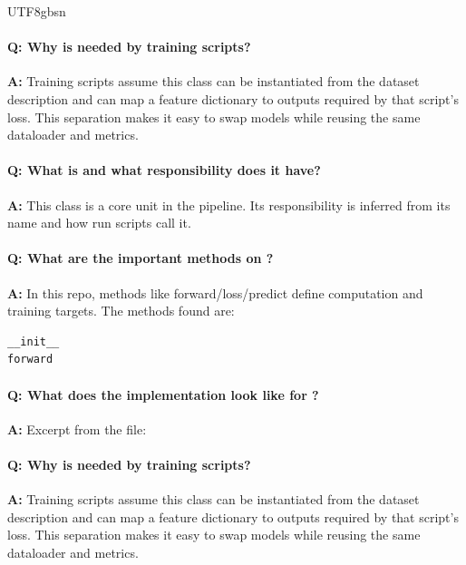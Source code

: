 \documentclass[11pt]{article}
\begin{document}
\begin{CJK*}{UTF8}{gbsn}
\vspace{1mm}


\paragraph{Q: Why is \texttt{} needed by training scripts?}
\textbf{A:} Training scripts assume this class can be instantiated from the dataset description and can map a feature dictionary to outputs required by that script's loss. This separation makes it easy to swap models while reusing the same dataloader and metrics.

\paragraph{Q: What is \texttt{} and what responsibility does it have?}
\textbf{A:} This class is a core unit in the pipeline. Its responsibility is inferred from its name and how run scripts call it.

\paragraph{Q: What are the important methods on \texttt{}?}
\textbf{A:} In this repo, methods like forward/loss/predict define computation and training targets. The methods found are:

\begin{Verbatim}[fontsize=\small]
__init__
forward
\end{Verbatim}

\paragraph{Q: What does the implementation look like for \texttt{}?}
\textbf{A:} Excerpt from the file:

\vspace{1mm}


\paragraph{Q: Why is \texttt{} needed by training scripts?}
\textbf{A:} Training scripts assume this class can be instantiated from the dataset description and can map a feature dictionary to outputs required by that script's loss. This separation makes it easy to swap models while reusing the same dataloader and metrics.


\end{CJK*}
\end{document}
